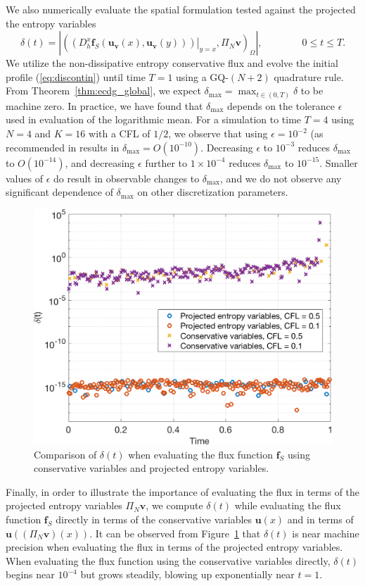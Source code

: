 \documentclass[preprint,10pt]{article}
\theoremstyle{definition}
\theoremstyle{lemma}
\theoremstyle{theorem}
\theoremstyle{assumption}
\newcommand{\LRp}[1]{\left( #1 \right)}
\newcommand{\LRb}[1]{\left| #1 \right|}
\begin{document}
We also numerically evaluate the spatial formulation tested against the projected the entropy variables
\[
\delta(t) = \LRb{\LRp{\left.\LRp{D^x_h \bm{f}_S(\bm{u}_{\bm{v}}(x),\bm{u}_{\bm{v}}(y))}\right|_{y=x},\Pi_N \bm{v}}_{\Omega}}, \qquad  \qquad 0\leq t \leq T.
\]
We utilize the non-dissipative entropy conservative flux and evolve the initial profile (\ref{eq:discontin}) until time $T = 1$ using a GQ-$(N+2)$ quadrature rule.  From Theorem~\ref{thm:ecdg_global}, we expect $\delta_{\max} = \max_{t\in (0,T)}{\delta}$ to be machine zero.  In practice, we have found that $\delta_{\max}$ depends on the tolerance $\epsilon$ used in evaluation of the logarithmic mean.  For a simulation to time $T=4$ using $N=4$ and $K = 16$ with a CFL of $1/2$, we observe that using $\epsilon = 10^{-2}$ (as recommended in \cite{ismail2009affordable} results in $\delta_{\max} = O\LRp{10^{-10}}$.  Decreasing $\epsilon$ to $10^{-3}$ reduces $\delta_{\max}$ to $O\LRp{10^{-14}}$, and decreasing $\epsilon$ further to $1\times 10^{-4}$ reduces $\delta_{\max}$ to $10^{-15}$.  Smaller values of $\epsilon$ do result in observable changes to $\delta_{\max}$, and we do not observe any significant dependence of $\delta_{\max}$ on other discretization parameters.  

\begin{figure}
\centering
\includegraphics[width=.5\textwidth]{figs/rhstest.png}
\caption{Comparison of $\delta(t)$ when evaluating the flux function $\bm{f}_S$ using conservative variables and projected entropy variables.}
\label{fig:rhstest}
\end{figure}
Finally, in order to illustrate the importance of evaluating the flux in terms of the projected entropy variables $\Pi_N \bm{v}$, we compute $\delta(t)$ while evaluating the flux function $\bm{f}_S$ directly in terms of the conservative variables $\bm{u}(x)$ and in terms of $\bm{u}\LRp{(\Pi_N \bm{v})(x)}$.  It can be observed from Figure~\ref{fig:rhstest} that $\delta(t)$ is near machine precision when evaluating the flux in terms of the projected entropy variables.  When evaluating the flux function using the conservative variables directly, $\delta(t)$ begins near $10^{-4}$ but grows steadily, blowing up exponentially near $t = 1$.  
\end{document}
